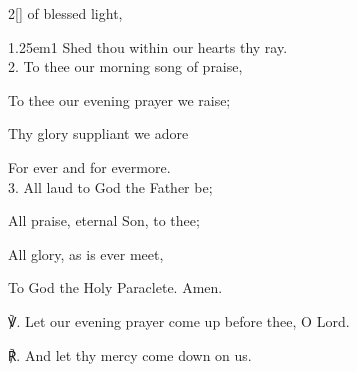 \begin{paracol}{2}[]
 of blessed light,



\begin{hangparas}{1.25em}{1}
Shed thou within our hearts thy ray.\\

2. To thee our morning song of praise,

To thee our evening prayer we raise;

Thy glory suppliant we adore

For ever and for evermore.\\

3. All laud to God the Father be;

All praise, eternal Son, to thee;

All glory, as is ever meet,

To God the Holy Paraclete. Amen.\\
\end{hangparas}

℣. Let our evening prayer come up before thee, O Lord.

℟. And let thy mercy come down on us.

\fussy
\end{paracol}